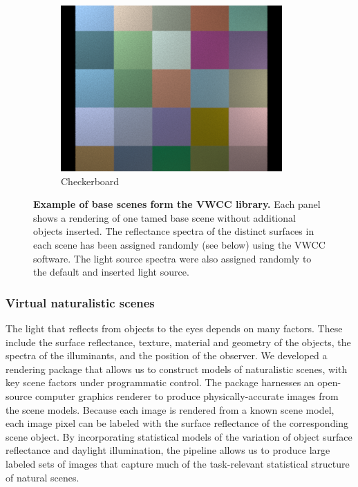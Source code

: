 \documentclass{jov}
\begin{document}
\begin{figure}[t]
\begin{subfigure}[b]{0.22 \textwidth}
        \includegraphics[width=\textwidth]{../Figures/Figure3/Figure3_f.png}
        \caption{Checkerboard}
        \label{fig:baseSceneCheckerBoard}
    \end{subfigure}
    \caption{{\bf Example of base scenes form the VWCC library.} Each panel shows a rendering of one tamed base scene without additional objects inserted.  The reflectance spectra of the distinct surfaces in each scene has been assigned randomly (see below) using the VWCC software.  The light source spectra were also assigned randomly to the default and inserted light source.}\label{fig:baseScenes}
\end{figure}

\subsubsection{Virtual naturalistic scenes}

The light that reflects from objects to the eyes depends on many factors.
These include the surface reflectance, texture, material and geometry of the objects, the spectra of the illuminants, and the position of the observer.
We developed a rendering package that allows us to construct models of naturalistic scenes, with key scene factors under programmatic control.
The package harnesses an open-source computer graphics renderer  \cite{jakob2015mitsuba} to produce physically-accurate images from the scene models.
Because each image is rendered from a known scene model, each image pixel can be labeled with the surface reflectance of the corresponding scene object.
By incorporating statistical models of the variation of object surface reflectance and daylight illumination, the pipeline allows us to produce large labeled sets of images that capture much of the task-relevant statistical structure of natural scenes.
\end{document}
